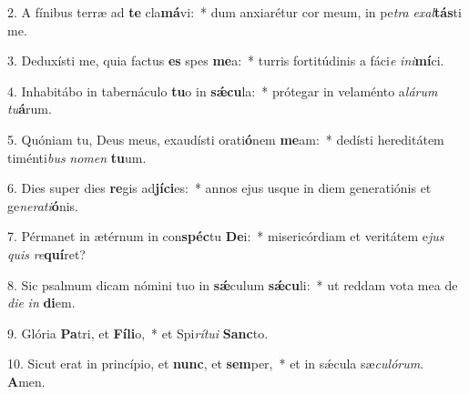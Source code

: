 2. A fínibus terræ ad \textbf{te} cla\textbf{má}vi:~*  dum anxiarétur cor meum, in pe\textit{tra} \textit{ex}\textit{al}\textbf{tás}ti me.\

3. Deduxísti me, quia factus \textbf{es} spes \textbf{me}a:~*  turris fortitúdinis a fáci\textit{e} \textit{in}\textit{i}\textbf{mí}ci.\

4. Inhabitábo in tabernáculo \textbf{tu}o in \textbf{sǽ}\textbf{cu}la:~*  prótegar in velaménto a\textit{lá}\textit{rum} \textit{tu}\textbf{á}rum.\

5. Quóniam tu, Deus meus, exaudísti orati\textbf{ó}nem \textbf{me}am:~*  dedísti hereditátem timénti\textit{bus} \textit{no}\textit{men} \textbf{tu}um.\

6. Dies super dies \textbf{re}gis ad\textbf{jí}\textbf{ci}es:~*  annos ejus usque in diem generatiónis et ge\textit{ne}\textit{ra}\textit{ti}\textbf{ó}nis.\

7. Pérmanet in ætérnum in con\textbf{spéc}tu \textbf{De}i:~*  misericórdiam et veritátem e\textit{jus} \textit{quis} \textit{re}\textbf{quí}ret?\

8. Sic psalmum dicam nómini tuo in \textbf{sǽ}culum \textbf{sǽ}\textbf{cu}li:~*  ut reddam vota mea de \textit{di}\textit{e} \textit{in} \textbf{di}em.\

9. Glória \textbf{Pa}tri, et \textbf{Fí}\textbf{li}o,~*  et Spi\textit{rí}\textit{tu}\textit{i} \textbf{Sanc}to.\

10. Sicut erat in princípio, et \textbf{nunc}, et \textbf{sem}per,~*  et in sǽcula sæ\textit{cu}\textit{ló}\textit{rum}. \textbf{A}men.\

